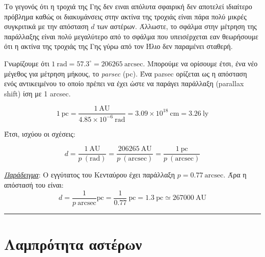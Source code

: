 Το γεγονός ότι η τροχιά της Γης δεν ειναι απόλυτα σφαιρική δεν αποτελεί ιδιαίτερο πρόβλημα καθώς οι διακυμάνσεις στην ακτίνα της τροχιάς είναι πάρα πολύ μικρές συγκριτικά με την απόσταση $d$ των αστέρων. Άλλωστε, το σφάλμα στην μέτρηση της παράλλαξης είναι πολύ μεγαλύτερο από το σφάλμα που υπεισέρχεται εαν θεωρήσουμε ότι η ακτίνα της τροχιάς της Γης γύρω από τον Ήλιο δεν παραμένει σταθερή.


Γνωρίζουμε ότι $1 \ \text{rad} = 57.3^{\circ} = 206265 \ \text{arcsec}$. Μπορούμε να ορίσουμε έτσι, ένα νέο μέγεθος για μέτρηση μήκους, το \textit{parsec} (pc). Ένα parsec ορίζεται ως η απόσταση ενός αντικειμένου το οποίο πρέπει να έχει ώστε να παράγει παράλλαξη (parallax shift) ίση με 1 arcsec.

\begin{equation}
    1 \ \text{pc} = \frac{1 \ \text{AU}}{4.85 \times 10^{-6} \ \text{rad}} = 3.09 \times 10^{18} \ \text{cm} = 3.26 \ \text{ly}
\end{equation}

Έτσι, ισχύου οι σχέσεις:

\begin{equation}
    d = \frac{1 \ \text{AU}}{p \ (\text{rad})} = \frac{206265 \ \text{AU}}{p \ (\text{arcsec})} = \frac{1 \ \text{pc}}{p \ (\text{arcsec})}
\end{equation}

\textit{\underline{Παράδειγμα}}: Ο εγγύτατος του Κενταύρου έχει παράλλαξη $ p = 0.77 \ \text{arcsec}$. Άρα η απόστασή του είναι:
\begin{equation*}
    d = \frac{1}{p \ \text{arcsec}} \text{pc} = \frac{1}{0.77} \ \text{pc} = 1.3 \ \text{pc} \simeq 267000 \ \text{AU}
\end{equation*}
\hrule



\section{Λαμπρότητα αστέρων}

